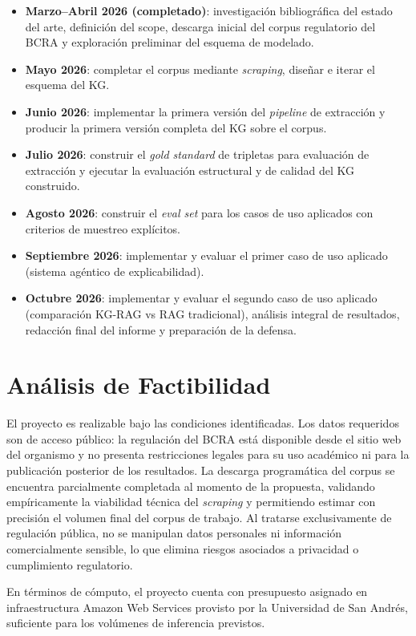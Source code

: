\documentclass[12pt,a4paper]{article}
\begin{document}
\begin{itemize}
    \item \textbf{Marzo--Abril 2026 (completado)}: investigación bibliográfica del estado del arte, definición del scope, descarga inicial del corpus regulatorio del BCRA y exploración preliminar del esquema de modelado.
    \item \textbf{Mayo 2026}: completar el corpus mediante \textit{scraping}, diseñar e iterar el esquema del KG.
    \item \textbf{Junio 2026}: implementar la primera versión del \textit{pipeline} de extracción y producir la primera versión completa del KG sobre el corpus.
    \item \textbf{Julio 2026}: construir el \textit{gold standard} de tripletas para evaluación de extracción y ejecutar la evaluación estructural y de calidad del KG construido.
    \item \textbf{Agosto 2026}: construir el \textit{eval set} para los casos de uso aplicados con criterios de muestreo explícitos.
    \item \textbf{Septiembre 2026}: implementar y evaluar el primer caso de uso aplicado (sistema agéntico de explicabilidad).
    \item \textbf{Octubre 2026}: implementar y evaluar el segundo caso de uso aplicado (comparación KG-RAG vs RAG tradicional), análisis integral de resultados, redacción final del informe y preparación de la defensa.
\end{itemize}

\section{Análisis de Factibilidad}
El proyecto es realizable bajo las condiciones identificadas. Los datos requeridos son de acceso público: la regulación del BCRA está disponible desde el sitio web del organismo y no presenta restricciones legales para su uso académico ni para la publicación posterior de los resultados. La descarga programática del corpus se encuentra parcialmente completada al momento de la propuesta, validando empíricamente la viabilidad técnica del \textit{scraping} y permitiendo estimar con precisión el volumen final del corpus de trabajo. Al tratarse exclusivamente de regulación pública, no se manipulan datos personales ni información comercialmente sensible, lo que elimina riesgos asociados a privacidad o cumplimiento regulatorio.

En términos de cómputo, el proyecto cuenta con presupuesto asignado en infraestructura Amazon Web Services provisto por la Universidad de San Andrés, suficiente para los volúmenes de inferencia previstos. 
\end{document}
